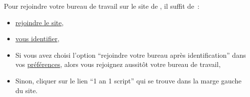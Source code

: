 Pour rejoindre votre bureau de travail sur le site de \boa{}, il suffit de~{}:

\begin{itemize}
\item \hyperlink{rejoindre-le-site}{rejoindre le site},
\item \hyperlink{vous-identifier}{vous identifier},
\item Si vous avez choisi l'option ``rejoindre votre bureau après identification'' dans vos \hyperlink{preferences-auteur}{préférences}, alors vous rejoignez aussitôt votre bureau de travail,
\item Sinon, cliquer sur le lien ``1 an 1 script'' qui se trouve dans la marge gauche du site.
\end{itemize}
